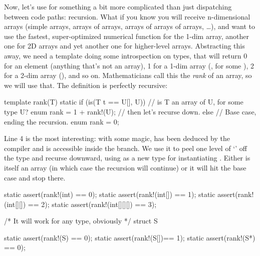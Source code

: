 Now, let's use  for something a bit more complicated than just dispatching between code paths: recursion.  What if you know you will receive n-dimensional arrays (simple arrays, arrays of arrays, arrays of arrays of arrays, \ldots), and want to use the fastest, super-optimized numerical function for the 1-dim array, another one for 2D arrays and yet another one for higher-level arrays. Abstracting this away, we need a template doing some introspection on types, that will return 0 for an element (anything that's not an array), 1 for a 1-dim array (, for some ), 2 for a 2-dim array (), and so on. Mathematicians call this the \emph{rank} of an array, so we will use that. The definition is perfectly recursive: 
\begin{ndcode}
template rank(T)
{
    static if (is(T t == U[], U)) // is T an array of U, for some type U?
        enum rank = 1 + rank!(U); // then let's recurse down.
    else                          // Base case, ending the recursion.
        enum rank = 0; 
}
\end{ndcode}

Line 4 is the most interesting: with some  magic,  has been deduced by the compiler and is accessible inside the  branch. We use it to peel one level of `\DD{[]}' off the type and recurse downward, using  as a new type for instantiating . Either  is itself an array (in which case the recursion will continue) or it will hit the base case and stop there.

\begin{dcode}
static assert(rank!(int)       == 0);
static assert(rank!(int[])     == 1);
static assert(rank!(int[][])   == 2);
static assert(rank!(int[][][]) == 3);

/* It will work for any type, obviously */
struct S {}

static assert(rank!(S)  == 0);
static assert(rank!(S[])== 1);
static assert(rank!(S*) == 0);
\end{dcode}


